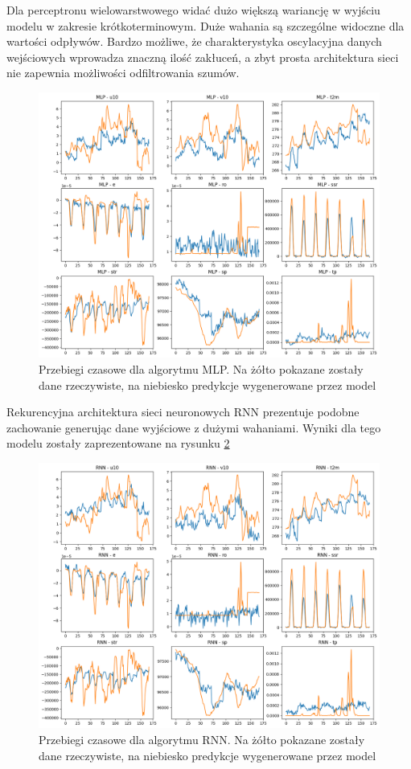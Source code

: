 Dla perceptronu wielowarstwowego widać dużo większą wariancję w wyjściu modelu 
w zakresie krótkoterminowym. Duże wahania są szczególne widoczne dla wartości odpływów.
Bardzo możliwe, że charakterystyka oscylacyjna danych wejściowych wprowadza znaczną
ilość zakłuceń, a zbyt prosta architektura sieci nie zapewnia możliwości odfiltrowania 
szumów. 

\begin{figure}[H]
    \centering
    \includegraphics[width=\textwidth]{images/MLP_week.png}
    \caption{Przebiegi czasowe dla algorytmu MLP. Na żółto pokazane zostały dane 
    rzeczywiste, na niebiesko predykcje wygenerowane przez model}
    \label{mlp-week}
\end{figure}

Rekurencyjna architektura sieci neuronowych RNN prezentuje podobne zachowanie 
generując dane wyjściowe z dużymi wahaniami. Wyniki dla tego modelu zostały zaprezentowane na rysunku \ref{rnn-week}

\begin{figure}[H]
    \centering
    \includegraphics[width=\textwidth]{images/rnn_week.png}
    \caption{Przebiegi czasowe dla algorytmu RNN. Na żółto pokazane zostały dane 
    rzeczywiste, na niebiesko predykcje wygenerowane przez model}
    \label{rnn-week}
\end{figure}

